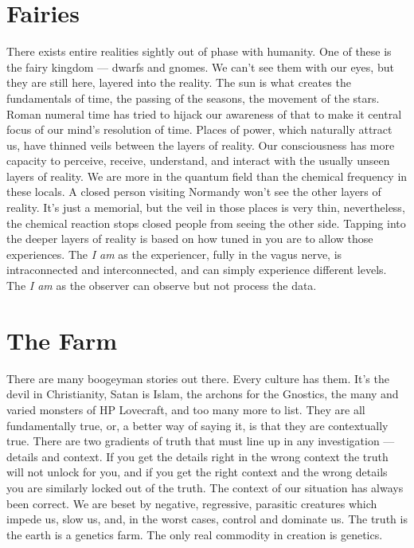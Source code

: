 \documentclass[letterpaper,9pt,twoside,titlepage,onecolumn,openany]{book}
\begin{document}
\section*{Fairies}\label{fairies}

There exists entire realities sightly out of phase with humanity. One of
these is the fairy kingdom --- dwarfs and gnomes. We can't see them with
our eyes, but they are still here, layered into the reality. The sun is
what creates the fundamentals of time, the passing of the seasons, the
movement of the stars. Roman numeral time has tried to hijack our
awareness of that to make it central focus of our mind's resolution of
time. Places of power, which naturally attract us, have thinned veils
between the layers of reality. Our consciousness has more capacity to
perceive, receive, understand, and interact with the usually unseen
layers of reality. We are more in the quantum field than the chemical
frequency in these locals. A closed person visiting Normandy won't see
the other layers of reality. It's just a memorial, but the veil in those
places is very thin, nevertheless, the chemical reaction stops closed
people from seeing the other side. Tapping into the deeper layers of
reality is based on how tuned in you are to allow those experiences. The
\emph{I am} as the experiencer, fully in the vagus nerve, is
intraconnected and interconnected, and can simply experience different
levels. The \emph{I am} as the observer can observe but not process the
data.

\section*{The Farm}\label{the-farm}

There are many boogeyman stories out there. Every culture has them. It's
the devil in Christianity, Satan is Islam, the archons for the Gnostics,
the many and varied monsters of HP Lovecraft, and too many more to list.
They are all fundamentally true, or, a better way of saying it, is that
they are contextually true. There are two gradients of truth that must
line up in any investigation --- details and context. If you get the
details right in the wrong context the truth will not unlock for you,
and if you get the right context and the wrong details you are similarly
locked out of the truth. The context of our situation has always been
correct. We are beset by negative, regressive, parasitic creatures which
impede us, slow us, and, in the worst cases, control and dominate us.
The truth is the earth is a genetics farm. The only real commodity in
creation is genetics.
\end{document}
